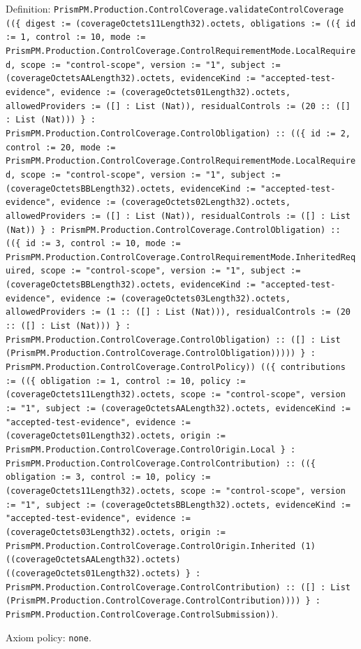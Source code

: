 \documentclass[11pt]{article}
\begin{document}
\noindent Definition: \texttt{PrismPM.Production.ControlCoverage.validateControlCoverage ((\{ digest := (coverageOctets11Length32).octets, obligations := ((\{ id := 1, control := 10, mode := PrismPM.Production.ControlCoverage.ControlRequirementMode.LocalRequired, scope := "control-scope", version := "1", subject := (coverageOctetsAALength32).octets, evidenceKind := "accepted-test-evidence", evidence := (coverageOctets01Length32).octets, allowedProviders := ([] : List (Nat)), residualControls := (20 :: ([] : List (Nat))) \} : PrismPM.Production.ControlCoverage.ControlObligation) :: ((\{ id := 2, control := 20, mode := PrismPM.Production.ControlCoverage.ControlRequirementMode.LocalRequired, scope := "control-scope", version := "1", subject := (coverageOctetsBBLength32).octets, evidenceKind := "accepted-test-evidence", evidence := (coverageOctets02Length32).octets, allowedProviders := ([] : List (Nat)), residualControls := ([] : List (Nat)) \} : PrismPM.Production.ControlCoverage.ControlObligation) :: ((\{ id := 3, control := 10, mode := PrismPM.Production.ControlCoverage.ControlRequirementMode.InheritedRequired, scope := "control-scope", version := "1", subject := (coverageOctetsBBLength32).octets, evidenceKind := "accepted-test-evidence", evidence := (coverageOctets03Length32).octets, allowedProviders := (1 :: ([] : List (Nat))), residualControls := (20 :: ([] : List (Nat))) \} : PrismPM.Production.ControlCoverage.ControlObligation) :: ([] : List (PrismPM.Production.ControlCoverage.ControlObligation))))) \} : PrismPM.Production.ControlCoverage.ControlPolicy)) ((\{ contributions := ((\{ obligation := 1, control := 10, policy := (coverageOctets11Length32).octets, scope := "control-scope", version := "1", subject := (coverageOctetsAALength32).octets, evidenceKind := "accepted-test-evidence", evidence := (coverageOctets01Length32).octets, origin := PrismPM.Production.ControlCoverage.ControlOrigin.Local \} : PrismPM.Production.ControlCoverage.ControlContribution) :: ((\{ obligation := 3, control := 10, policy := (coverageOctets11Length32).octets, scope := "control-scope", version := "1", subject := (coverageOctetsBBLength32).octets, evidenceKind := "accepted-test-evidence", evidence := (coverageOctets03Length32).octets, origin := PrismPM.Production.ControlCoverage.ControlOrigin.Inherited (1) ((coverageOctetsAALength32).octets) ((coverageOctets01Length32).octets) \} : PrismPM.Production.ControlCoverage.ControlContribution) :: ([] : List (PrismPM.Production.ControlCoverage.ControlContribution)))) \} : PrismPM.Production.ControlCoverage.ControlSubmission))}.\par
\noindent Axiom policy: \texttt{none}.\par
\end{document}
